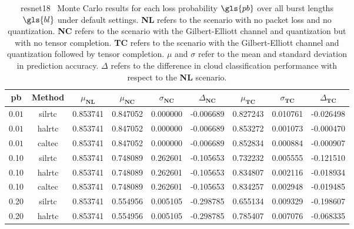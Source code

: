 \begin{table}[H]
	\caption[Summarized ResNet18 Monte Carlo results with tensor completion]{\gls{resnet18} \addone~Monte Carlo results for each loss probability $\gls{pb}$ over all burst lengths $\gls{bl}$ under default settings. \textbf{NL} refers to the scenario with no packet loss and no quantization. \textbf{NC} refers to the scenario with the Gilbert-Elliott channel and quantization but with no tensor completion. \textbf{TC} refers to the scenario with the Gilbert-Elliott channel and quantization followed by tensor completion. $\mu$ and $\sigma$ refer to the mean and standard deviation in prediction accuracy. $\Delta$ refers to the difference in cloud classification performance with respect to the \textbf{NL} scenario.}\label{table:expts:mc:long}
	\centering 
	\begin{adjustbox}{max width=\textwidth}
		\begin{tabular}{|c|c|c|ccc|ccc|}
			\hline 
			\gls{pb} & \textbf{Method} &   $\mu_{\textbf{NL}}$ &   $\mu_{\textbf{NC}}$ &  $\sigma_{\textbf{NC}}$ &  $\Delta_{\textbf{NC}}$ & $\mu_{\textbf{TC}}$ & $\sigma_{\textbf{TC}}$ & $\Delta_{\textbf{TC}}$ \\
			\hline \hline
			$0.01$ & \gls{silrtc} & 0.853741 &  0.847052 &  0.000000 & -0.006689 & 0.827243 &    0.010761 &   -0.026498 \\
			$0.01$ & \cellcolor{green!25}\gls{halrtc} & 0.853741 &  0.847052 &  0.000000 & -0.006689 & \cellcolor{green!25}0.853272 &    0.001073 &   \cellcolor{green!25}-0.000470 \\
			$0.01$ & \gls{caltec} & 0.853741 &  0.847052 &  0.000000 &  -0.006689 & 0.852834 &    0.000884 &   -0.000907 \\
			\hline 
			0.10 & \gls{silrtc} &  0.853741 &  0.748089 &  0.262601 & -0.105653 &    0.732232 &    0.005555 &   -0.121510 \\
			0.10 & \cellcolor{green!25}\gls{halrtc} & 0.853741 &  0.748089 &  0.262601 & -0.105653 & \cellcolor{green!25}0.834807 &    0.002116 &   \cellcolor{green!25}-0.018934 \\
			0.10 & \gls{caltec} & 0.853741 &  0.748089 &  0.262601 & -0.105653 & 0.834257 &    0.002948 &   -0.019485 \\
			\hline
			0.20 & \gls{silrtc} & 0.853741 &  0.554956 &  0.005105 & -0.298785 &     0.655134 &    0.009329 &   -0.198607\\
			0.20 & \gls{halrtc} & 0.853741 &  0.554956 &  0.005105 & -0.298785 &  0.785407 &    0.007076 &   -0.068335\\

\end{tabular}
\end{adjustbox}
\end{table}
